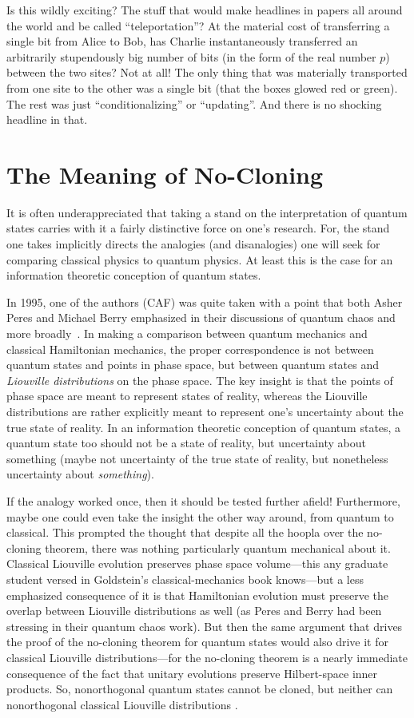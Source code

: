 \documentclass[aps,pra,superscriptaddress,10pt,tightenlines,twocolumn,nofootinbib]{revtex4}
\begin{document}
Is this wildly exciting?  The stuff that would make headlines in
papers all around the world and be called ``teleportation''?  At the
material cost of transferring a single bit from Alice to Bob, has
Charlie instantaneously transferred an arbitrarily stupendously big
number of bits (in the form of the real number $p$) between the two
sites?  Not at all!  The only thing that was materially transported
from one site to the other was a single bit (that the boxes glowed red
or green).  The rest was just ``conditionalizing'' or ``updating''.
And there is no shocking headline in that.

\section{The Meaning of No-Cloning}

It is often underappreciated that taking a stand on the interpretation of quantum states carries with it a fairly distinctive force on one's research.  For, the stand one takes implicitly directs the analogies (and disanalogies) one will seek for comparing classical physics to quantum physics.  At least this is the case for an information theoretic conception of quantum states.

In 1995, one of the authors (CAF) was quite taken with a point that both Asher Peres and Michael Berry emphasized in their discussions of quantum chaos and more broadly~\cite{Peres95}.  In making a comparison between quantum mechanics and classical Hamiltonian mechanics, the proper correspondence is not between quantum states and points in phase space, but between quantum states and {\it Liouville distributions\/} on the phase space.  The key insight is that the points of phase space are meant to represent states of reality, whereas the Liouville distributions are rather explicitly meant to represent one's uncertainty about the true state of reality.  In an information theoretic conception of quantum states, a quantum state too should not be a state of reality, but uncertainty about something (maybe not uncertainty of the true state of reality, but nonetheless uncertainty about  {\it something\/}).

If the analogy worked once, then it should be tested further afield!  Furthermore, maybe one could even take the insight the other way around, from quantum to classical.  This prompted the thought that despite all the hoopla over the no-cloning theorem,  there was nothing particularly quantum mechanical about it.  Classical Liouville evolution preserves phase space volume---this any graduate student versed in Goldstein's classical-mechanics book \cite{Goldstein65} knows---but a less emphasized consequence of it is that Hamiltonian evolution must preserve the overlap between Liouville distributions as well (as Peres and Berry had been stressing in their quantum chaos work).  But then the same argument that drives the proof of the no-cloning theorem for quantum states would also drive it for classical Liouville distributions---for the no-cloning theorem is a nearly immediate consequence of the fact that unitary evolutions preserve Hilbert-space inner products.  So, nonorthogonal quantum states cannot be cloned, but neither can nonorthogonal classical Liouville distributions \cite{Caves96}.
\end{document}
